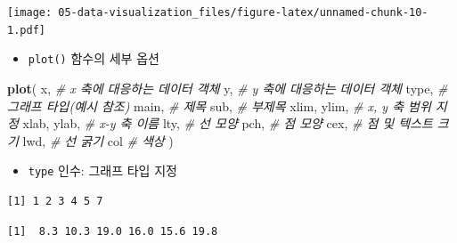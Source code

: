 \documentclass[
  11pt,
]{krantz}
\newenvironment{Shaded}{\begin{snugshade}}{\end{snugshade}}
\newcommand{\CommentTok}[1]{\textcolor[rgb]{0.37,0.37,0.37}{\textit{#1}}}
\newcommand{\KeywordTok}[1]{\textcolor[rgb]{0.27,0.27,0.27}{\textbf{#1}}}
\newcommand{\NormalTok}[1]{#1}
\newcommand{\OperatorTok}[1]{\textcolor[rgb]{0.43,0.43,0.43}{\textbf{#1}}}
\newcommand{\StringTok}[1]{\textcolor[rgb]{0.5,0.5,0.5}{#1}}
\providecommand{\tightlist}{%
  \setlength{\itemsep}{0pt}\setlength{\parskip}{0pt}}
\begin{document}
\texttt{[image: 05-data-visualization\_files/figure-latex/unnamed-chunk-10-1.pdf]}

\normalsize

\begin{itemize}
\tightlist
\item
  \texttt{plot()} 함수의 세부 옵션
\end{itemize}

\footnotesize

\begin{Shaded}
\begin{Highlighting}[]
\KeywordTok{plot}\NormalTok{(}
\NormalTok{  x, }\CommentTok{# x 축에 대응하는 데이터 객체}
\NormalTok{  y, }\CommentTok{# y 축에 대응하는 데이터 객체}
\NormalTok{  type, }\CommentTok{# 그래프 타입(예시 참조)}
\NormalTok{  main, }\CommentTok{# 제목 }
\NormalTok{  sub,  }\CommentTok{# 부제목 }
\NormalTok{  xlim, ylim, }\CommentTok{# x, y 축 범위 지정}
\NormalTok{  xlab, ylab, }\CommentTok{# x-y 축 이름}
\NormalTok{  lty, }\CommentTok{# 선 모양}
\NormalTok{  pch, }\CommentTok{# 점 모양}
\NormalTok{  cex, }\CommentTok{# 점 및 텍스트 크기}
\NormalTok{  lwd, }\CommentTok{# 선 굵기}
\NormalTok{  col  }\CommentTok{# 색상}
\NormalTok{)}
\end{Highlighting}
\end{Shaded}

\normalsize

\begin{itemize}
\tightlist
\item
  \texttt{type} 인수: 그래프 타입 지정
\end{itemize}

\footnotesize

\begin{Shaded}
\end{Shaded}

\begin{verbatim}
[1] 1 2 3 4 5 7
\end{verbatim}

\begin{verbatim}
[1]  8.3 10.3 19.0 16.0 15.6 19.8
\end{verbatim}
\end{document}
